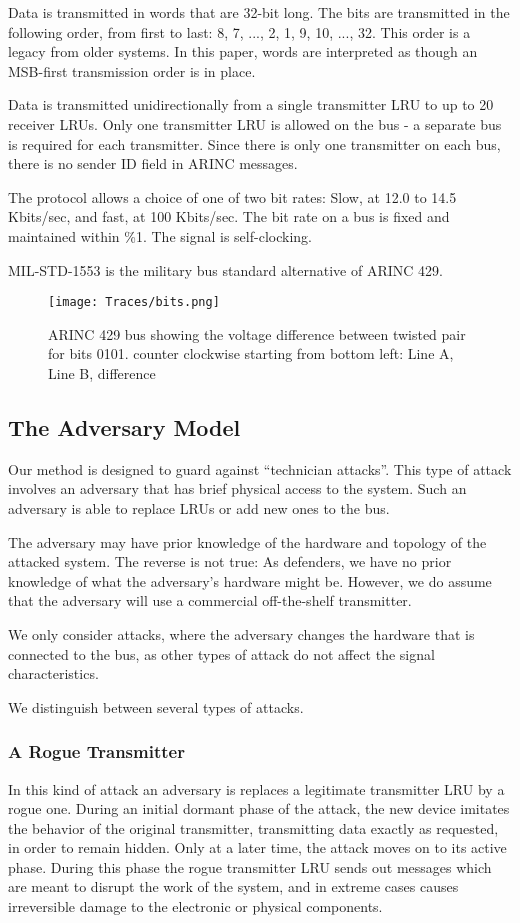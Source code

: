 \documentclass[conference]{IEEEtran}
\begin{document}
  Data is transmitted in words that are 32-bit long. The bits are transmitted in the following order, from first to last: 8, 7, ..., 2, 1, 9, 10, ..., 32. This order is a legacy from older systems. In this paper, words are interpreted as though an MSB-first transmission order is in place.
  
  Data is transmitted unidirectionally from a single transmitter LRU to up to 20 receiver LRUs. Only one transmitter LRU is allowed on the bus - a separate bus is required for each transmitter. Since there is only one transmitter on each bus, there is no sender ID field in ARINC messages.
   
  The protocol allows a choice of one of two bit rates: Slow, at 12.0 to 14.5 Kbits/sec, and fast, at 100 Kbits/sec. The bit rate on a bus is fixed and maintained within \%1. The signal is self-clocking.
  
  MIL-STD-1553 \cite{united1986milstd1553} is the military bus standard alternative of ARINC 429.
  
  \begin{figure}[t]
    \centering
    \texttt{[image: Traces/bits.png]}
    \caption{ARINC 429 bus showing the voltage difference between twisted pair for bits 0101. counter clockwise starting from bottom left: Line A, Line B, difference}
    \label{fig:word_example}
  \end{figure}
  
\subsection{The Adversary Model}
  Our method is designed to guard against ``technician attacks''. This type of attack involves an adversary that has brief physical access to the system. Such an adversary is able to replace LRUs or add new ones to the bus.
  
  The adversary may have prior knowledge of the hardware and topology of the attacked system. The reverse is not true: As defenders, we have no prior knowledge of what the adversary's hardware might be. However, we do assume that the adversary will use a commercial off-the-shelf transmitter.
  
  We only consider attacks, where the adversary changes the hardware that is connected to the bus, as other types of attack do not affect the signal characteristics.
  
  We distinguish between several types of attacks.

\subsubsection{A Rogue Transmitter}
  In this kind of attack an adversary is replaces a legitimate transmitter LRU by a rogue one. During an initial dormant phase of the attack, the new device imitates the behavior of the original transmitter, transmitting data exactly as requested, in order to remain hidden. Only at a later time, the attack moves on to its active phase. During this phase the rogue transmitter LRU sends out messages which are meant to disrupt the work of the system, and in extreme cases causes irreversible damage to the electronic or physical components.
  
\end{document}
